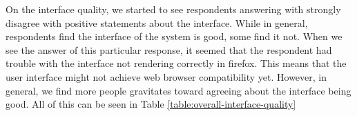 \begin{center}
\label{table:overall-interface-quality}
\end{center}
\vspace{0.5cm}


On the interface quality, we started to see respondents answering with strongly disagree with positive statements about the interface. While in general, respondents find the interface of the system is good, some find it not. When we see the answer of this particular response, it seemed that the respondent had trouble with the interface not rendering correctly in firefox. This means that the user interface might not achieve web browser compatibility yet. However, in general, we find more people gravitates toward agreeing about the interface being good. All of this can be seen in Table \ref{table:overall-interface-quality}


